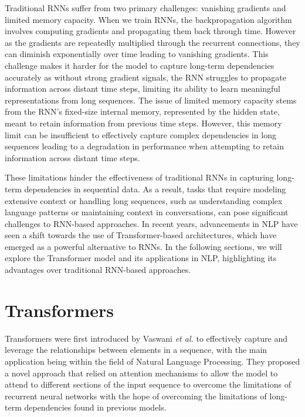 Traditional RNNs suffer from two primary challenges: vanishing gradients and limited memory capacity. When we train RNNs, the backpropagation algorithm involves computing gradients and propagating them back through time. However as the gradients are repeatedly multiplied through the recurrent connections, they can diminish exponentially over time leading to vanishing gradients. This challenge makes it harder for the model to capture long-term dependencies accurately as without strong gradient signals, the RNN struggles to propagate information across distant time steps, limiting its ability to learn meaningful representations from long sequences. The issue of limited memory capacity stems from the RNN's fixed-size internal memory, represented by the hidden state, meant to retain information from previous time steps. However, this memory limit can be insufficient to effectively capture complex dependencies in long sequences leading to a degradation in performance when attempting to retain information across distant time steps.

These limitations hinder the effectiveness of traditional RNNs in capturing long-term dependencies in sequential data. As a result, tasks that require modeling extensive context or handling long sequences, such as understanding complex language patterns or maintaining context in conversations, can pose significant challenges to RNN-based approaches. In recent years, advancements in NLP have seen a shift towards the use of Transformer-based architectures, which have emerged as a powerful alternative to RNNs. In the following sections, we will explore the Transformer model and its applications in NLP, highlighting its advantages over traditional RNN-based approaches.

\section{Transformers}

Transformers were first introduced by Vaswani \textit{et al.} \cite{transformer_paper} to effectively capture and leverage the relationships between elements in a sequence, with the main application being within the field of Natural Language Processing. They proposed a novel approach that relied on attention mechanisms to allow the model to attend to different sections of the input sequence to overcome the limitations of recurrent neural networks with the hope of overcoming the limitations of long-term dependencies found in previous models.

